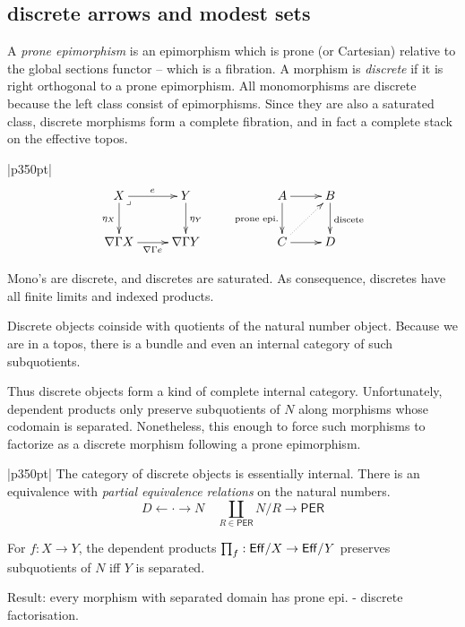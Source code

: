 \documentclass[12pt,a4paper]{article}
\theoremstyle{definition}
\newcommand\hide[1]{}
\newenvironment{blackboard}{\begin{tabular}{|p{350pt}|}\hline} {\\ \hline \end{tabular} }
\begin{document}
\subsection{discrete arrows and modest sets}
A \emph{prone epimorphism} is an epimorphism which is prone (or Cartesian) relative to the global sections functor -- which is a fibration.
A morphism is \emph{discrete} if it is right orthogonal to a prone epimorphism. All monomorphisms are discrete because the left class consist of epimorphisms. Since they are also a saturated class, discrete morphisms form a complete fibration, and in fact a complete stack on the effective topos.

\begin{blackboard}
\[\xymatrix{
X\ar[r]^e\ar[d]_{\eta_X}\ar@{}[dr]|<\lrcorner & Y\ar[d]^{\eta_Y}\\
\nabla\Gamma X\ar[r]_{\nabla\Gamma e} & \nabla\Gamma Y
}\qquad
\xymatrix{
A\ar[r]\ar[d]_{\textrm{prone epi.}} & B\ar[d]^{\textrm{discete}}\\
C\ar[r]\ar@{.>}[ur] & D
}
\]

Mono's are discrete, and discretes are saturated. As consequence, discretes have all finite limits and indexed products.
\end{blackboard}

Discrete objects coinside with quotients of the natural number object. Because we are in a topos, there is a bundle and even an internal category of such subquotients. 
\hide{laat zien wat je bedoelt}
Thus discrete objects form a kind of complete internal category. Unfortunately, dependent products only preserve subquotients of $N$ along morphisms whose codomain is separated. Nonetheless, this enough to force such morphisms to factorize as a discrete morphism following a prone epimorphism.

\begin{blackboard}
The category of discrete objects is essentially internal. There is an equivalence with \emph{partial equivalence relations} on the natural numbers.
\[ D \leftarrow \cdot \rightarrow N\quad \coprod_{R\in \mathsf{PER}} N/R \to \mathsf{PER} \]

For $f:X\to Y$, the dependent products $\prod_f:\mathsf{Eff}/X\to \mathsf{Eff}/Y$ preserves subquotients of $N$ iff $Y$ is separated.

Result: every morphism with separated domain has prone epi. - discrete factorisation.
\end{blackboard}
\end{document}
